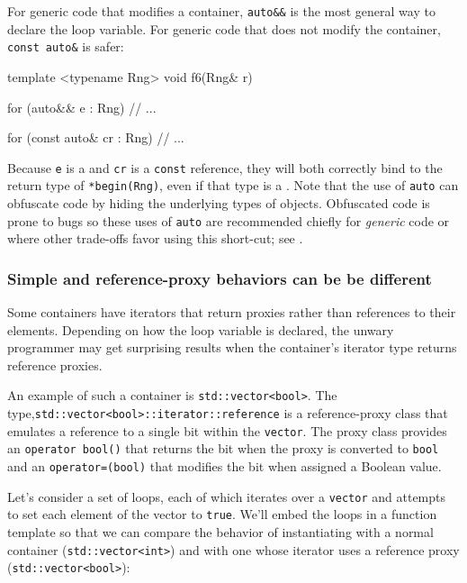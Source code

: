 {{{For generic code that modifies a container, \lstinline!auto&&! is the
most general way to declare the loop variable. For generic code that
does not modify the container, \lstinline!const!~\lstinline!auto&! is safer:

\begin{emcppslisting}
template <typename Rng>
void f6(Rng& r)
{
    for (auto&& e : Rng)
    {
        // ...
    }

    for (const auto& cr : Rng)
    {
        // ...
    }
}
\end{emcppslisting}
    

\noindent Because \lstinline!e! is a  and \lstinline!cr! is
a \lstinline!const! reference, they will both correctly bind to the return
type of \lstinline!*begin(Rng)!, even if that type is a .
Note that the use of \lstinline!auto! can obfuscate code by hiding the
underlying types of objects. Obfuscated code is prone to bugs so these
uses of \lstinline!auto! are recommended chiefly for \emph{generic} code or
where other trade-offs favor using this short-cut; see .

\subsubsection[Simple and reference-proxy behaviors can be be different]{Simple and reference-proxy behaviors can be be different}\label{simple-and-reference-proxy-behaviors-can-be-be-different}

Some containers have iterators that return proxies rather than
references to their elements. Depending on how the loop variable is
declared, the unwary programmer may get surprising results when the
container's iterator type returns reference proxies.

An example of such a container is \lstinline!std::vector<bool>!. The type,\linebreak[4]
\lstinline!std::vector<bool>::iterator::reference! is a reference-proxy
class that emulates a reference to a single bit within the
\lstinline!vector!. The proxy class provides an
\lstinline!operator!~\lstinline!bool()! that returns the bit when the proxy is
converted to \lstinline!bool! and an \lstinline!operator=(bool)! that modifies
the bit when assigned a Boolean value.

Let's consider a set of loops, each of which iterates over a
\lstinline!vector! and attempts to set each element of the vector to
\lstinline!true!. We'll embed the loops in a function template so that we
can compare the behavior of instantiating with a normal container
(\lstinline!std::vector<int>!) and with one whose iterator uses a reference
proxy (\lstinline!std::vector<bool>!):

}}}
